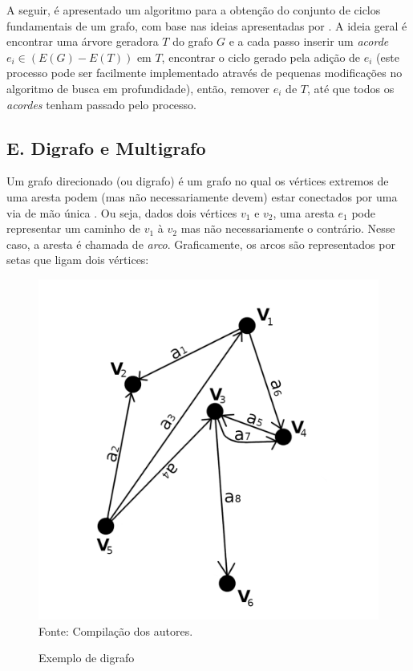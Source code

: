 \documentclass[twocolumn, 10pt,a4paper]{extarticle}
\begin{document}
A seguir, é apresentado um algoritmo para a obtenção do conjunto de ciclos fundamentais de um grafo, com base nas ideias apresentadas por \cite{krishna}. A ideia geral é encontrar uma árvore geradora $T$ do grafo $G$ e a cada passo inserir um \textit{acorde} $e_i \in (E(G)-E(T))$ em $T$, encontrar o ciclo gerado pela adição de $e_i$ (este processo pode ser facilmente implementado através de pequenas modificações no algoritmo de busca em profundidade), então, remover $e_i$ de $T$, até que todos os \textit{acordes} tenham passado pelo processo.

\begingroup
{}\label{lp}
\begin{algorithmic}[1]
	\EndFor
\EndFunction
\end{algorithmic}
\hrulefill
\endgroup

\subsection*{E. \quad Digrafo e Multigrafo}

Um grafo direcionado (ou digrafo) é um grafo no qual os vértices extremos de uma aresta podem (mas não necessariamente devem) estar conectados por uma via de mão única \cite[p. 566]{sedgewick}. Ou seja, dados dois vértices $v_1$ e $v_2$, uma aresta $e_1$ pode representar um caminho de $v_1$ à $v_2$ mas não necessariamente o contrário. Nesse caso, a aresta é chamada de \textit{arco}. Graficamente, os arcos são representados por setas que ligam dois vértices:

\begin{figure}[H]
	\caption{Exemplo de digrafo} 
	\centering
	\includegraphics[scale=0.7]{digrafo1}
	\\ Fonte: Compilação dos autores.
\end{figure}
\end{document}
